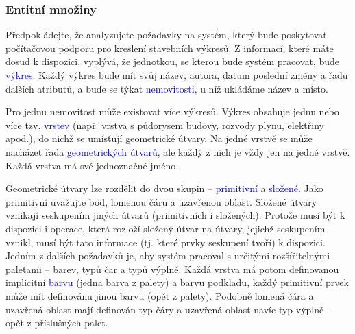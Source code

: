 \documentclass{beamer}
\begin{document}
  \begin{frame}
    \frametitle{Entitní množiny}
      \scriptsize{
      \hspace{0.5cm}Předpokládejte, že analyzujete požadavky na systém, který bude poskytovat počítačovou
      podporu pro kreslení stavebních výkresů. Z informací, které máte dosud k dispozici,
      vyplývá, že jednotkou, se kterou bude systém pracovat, bude \textcolor{blue}{výkres}. Každý výkres bude
      mít svůj název, autora, datum poslední změny a řadu dalších atributů, a bude se týkat
      \textcolor{blue}{nemovitosti}, u níž ukládáme název a místo.\par


      \hspace{0.5cm}Pro jednu nemovitost může existovat více výkresů. Výkres obsahuje jednu nebo více tzv.
      \textcolor{blue}{vrstev} (např. vrstva s půdorysem budovy, rozvody plynu, elektřiny apod.), do nichž se
      umísťují geometrické útvary. Na jedné vrstvě se může nacházet řada \textcolor{blue}{geometrických útvarů},
      ale každý z nich je vždy jen na jedné vrstvě. Každá vrstva má své jednoznačné jméno.\par


      \hspace{0.5cm}Geometrické útvary lze rozdělit do dvou skupin -- \textcolor{blue}{primitivní} a \textcolor{blue}{složené}. Jako primitivní
      uvažujte bod, lomenou čáru a uzavřenou oblast. Složené útvary vznikají seskupením jiných
      útvarů (primitivních i složených). Protože musí být k dispozici i operace, která rozloží
      složený útvar na útvary, jejichž seskupením vznikl, musí být tato informace (tj. které
      prvky seskupení tvoří) k dispozici. Jedním z dalších požadavků je, aby systém pracoval
      s určitými rozšířitelnými paletami -- barev, typů čar a typů výplně. Každá vrstva má
      potom definovanou implicitní \textcolor{blue}{barvu} (jedna barva  z  palety) a barvu podkladu, každý
      primitivní prvek může mít definovánu jinou barvu (opět z palety). Podobně lomená čára
      a uzavřená oblast mají definován typ čáry a uzavřená oblast navíc typ výplně – opět
      z příslušných palet.\par}
  \end{frame}
\end{document}
